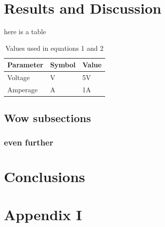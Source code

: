 \documentclass[a4paper,11pt]{MeLabtexMemo}
\begin{document}
\section{Results and Discussion}

here is a table 
\begin{longtable}{lll}
\caption{Values used in equations 1 and 2}
\label{tab:my-table}\\
Parameter & Symbol & Value \\
\endhead
%
Voltage & V & 5V \\
Amperage & A & 1A
\end{longtable}

\subsection{Wow subsections}
\subsubsection{even further}


\section{Conclusions}
\appendix
\section{Appendix I}
 
\printbibliography %
\end{document}
